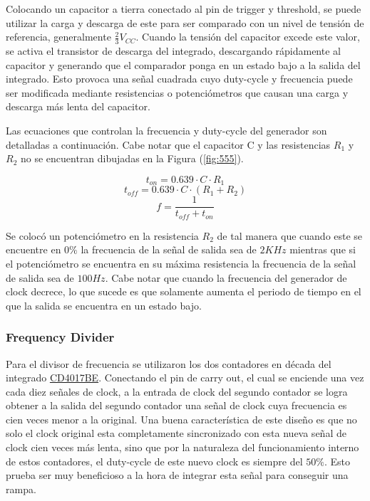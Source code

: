 Colocando un capacitor a tierra conectado al pin de trigger y threshold, se puede utilizar la carga y descarga de este para ser comparado con un nivel de tensión de referencia, generalmente $\frac{2}{3} V_{CC}$. Cuando la tensión del capacitor excede este valor, se activa el transistor de descarga del integrado, descargando rápidamente al capacitor y generando que el comparador ponga en un estado bajo a la salida del integrado. Esto provoca una señal cuadrada cuyo duty-cycle y frecuencia puede ser modificada mediante resistencias o potenciómetros que causan una carga y descarga más lenta del capacitor. 

Las ecuaciones que controlan la frecuencia y duty-cycle del generador son detalladas a continuación. Cabe notar que el capacitor C y las resistencias $R_1$ y $R_2$ no se encuentran dibujadas en la Figura (\ref{fig:555}).

\begin{equation}
t_{on} = 0.639\cdot C \cdot R_1
\end{equation}
\begin{equation}
t_{off} = 0.639 \cdot C \cdot (R_1 + R_2)
\end{equation}
\begin{equation}
f=\frac{1}{t_{off} + t_{on}}
\end{equation}

Se colocó un potenciómetro en la resistencia $R_2$ de tal manera que cuando este se encuentre en $0\%$ la frecuencia de la señal de salida sea de $2KHz$ mientras que si el potenciómetro se encuentra en su máxima resistencia la frecuencia de la señal de salida sea de $100Hz$. Cabe notar que cuando la frecuencia del generador de clock decrece, lo que sucede es que solamente aumenta el periodo de tiempo en el que la salida se encuentra en un estado bajo.

\subsubsection{Frequency Divider}

Para el divisor de frecuencia se utilizaron los dos contadores en década del integrado \href{http://www.ti.com/lit/ds/symlink/cd4017b.pdf}{CD4017BE}. Conectando el pin de carry out, el cual se enciende una vez cada diez señales de clock, a la entrada de clock del segundo contador se logra obtener a la salida del segundo contador una señal de clock cuya frecuencia es cien veces menor a la original. Una buena característica de este diseño es que no solo el clock original esta completamente sincronizado con esta nueva señal de clock cien veces más lenta, sino que por la naturaleza del funcionamiento interno de estos contadores, el duty-cycle de este nuevo clock es siempre del $50\%$. Esto prueba ser muy beneficioso a la hora de integrar esta señal para conseguir una rampa.

